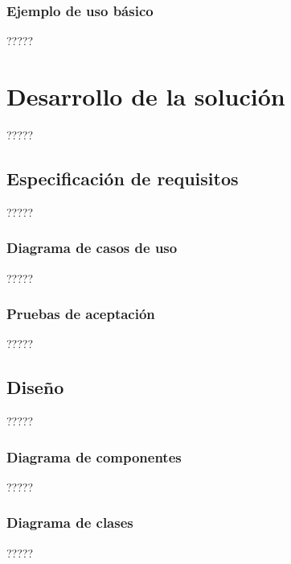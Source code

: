 \documentclass[11pt,spanish,listoffigures]{tfgetsinf}
\begin{document}
\subsection{Ejemplo de uso básico}

?????


\chapter{Desarrollo de la solución}

?????


\section{Especificación de requisitos}

?????

\subsection{Diagrama de casos de uso}

?????

\subsection{Pruebas de aceptación}

?????


\section{Diseño}

?????

\subsection{Diagrama de componentes}

?????

\subsection{Diagrama de clases}

?????
\end{document}
